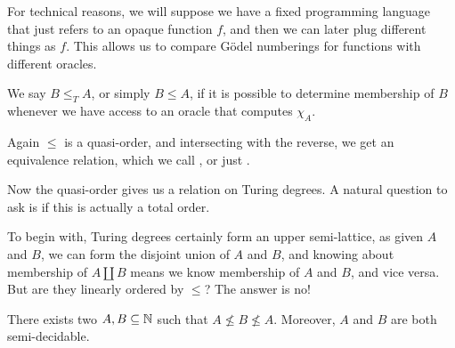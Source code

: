\documentclass[a4paper]{article}
\begin{document}
For technical reasons, we will suppose we have a fixed programming language that just refers to an opaque function $f$, and then we can later plug different things as $f$. This allows us to compare G\"odel numberings for functions with different oracles.

\begin{defi}\index{$\leq$}
  We say $B \leq_T A$, or simply $B \leq A$, if it is possible to determine membership of $B$ whenever we have access to an oracle that computes $\chi_A$.
\end{defi}
Again $\leq$ is a quasi-order, and intersecting with the reverse, we get an equivalence relation, which we call , or just .

Now the quasi-order gives us a relation on Turing degrees. A natural question to ask is if this is actually a total order.

To begin with, Turing degrees certainly form an upper semi-lattice, as given $A$ and $B$, we can form the disjoint union of $A$ and $B$, and knowing about membership of $A \coprod B$ means we know membership of $A$ and $B$, and vice versa. But are they linearly ordered by $\leq$? The answer is no!
\begin{thm}
  There exists two $A, B \subseteq \mathbb{N}$ such that $A \not\leq B \not\leq A$. Moreover, $A$ and $B$ are both semi-decidable.
\end{thm}
\end{document}
